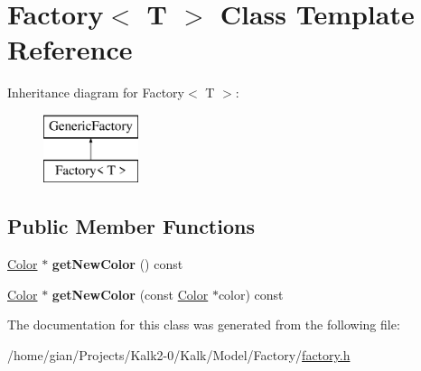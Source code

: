 \hypertarget{class_factory}{}\section{Factory$<$ T $>$ Class Template Reference}
\label{class_factory}
Inheritance diagram for Factory$<$ T $>$\+:\begin{figure}[H]
\begin{center}
\leavevmode
\includegraphics[height=2.000000cm]{class_factory}
\end{center}
\end{figure}
\subsection*{Public Member Functions}
\begin{DoxyCompactItemize}
\item 
\mbox{\label{class_factory_a6c7dcfb9ba1de182fcd6b2e0990d02f3}} 
\hyperlink{class_color}{Color} $\ast$ {\bfseries get\+New\+Color} () const
\item 
\mbox{\label{class_factory_a4bfca7f98466684ad447c753b678628a}} 
\hyperlink{class_color}{Color} $\ast$ {\bfseries get\+New\+Color} (const \hyperlink{class_color}{Color} $\ast$color) const
\end{DoxyCompactItemize}


The documentation for this class was generated from the following file\+:\begin{DoxyCompactItemize}
\item 
/home/gian/\+Projects/\+Kalk2-\/0/\+Kalk/\+Model/\+Factory/\hyperlink{factory_8h}{factory.\+h}\end{DoxyCompactItemize}
